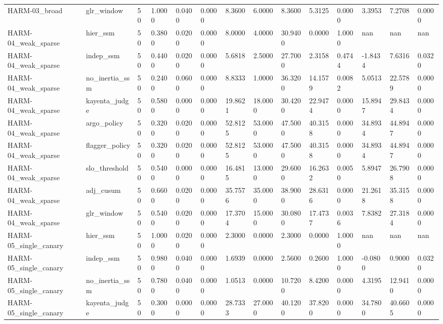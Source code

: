 \begin{table}[htbp]
\begin{tabular}{llllllllllllll}
HARM-03\_broad & glr\_window & 50 & 1.0000 & 0.0400 & 0.0000 & 8.3600 & 6.0000 & 8.3600 & 5.3125 & 0.0000 & 3.3953 & 7.2708 & 0.0000 \\
HARM-04\_weak\_sparse & hier\_ssm & 50 & 0.3800 & 0.0200 & 0.0000 & 8.0000 & 4.0000 & 30.9400 & 0.0000 & 1.0000 & nan & nan & nan \\
HARM-04\_weak\_sparse & indep\_ssm & 50 & 0.4400 & 0.0200 & 0.0000 & 5.6818 & 2.5000 & 27.7000 & 2.3158 & 0.4744 & -1.8434 & 7.6316 & 0.0320 \\
HARM-04\_weak\_sparse & no\_inertia\_ssm & 50 & 0.2400 & 0.0600 & 0.0000 & 8.8333 & 1.0000 & 36.3200 & 14.1579 & 0.0082 & 5.0513 & 22.5789 & 0.0000 \\
HARM-04\_weak\_sparse & kayenta\_judge & 50 & 0.5800 & 0.0000 & 0.0000 & 19.8621 & 18.0000 & 30.4200 & 22.9474 & 0.0000 & 15.8947 & 29.8434 & 0.0000 \\
HARM-04\_weak\_sparse & argo\_policy & 50 & 0.3200 & 0.0200 & 0.0000 & 52.8125 & 53.0000 & 47.5000 & 40.3158 & 0.0000 & 34.8934 & 44.8947 & 0.0000 \\
HARM-04\_weak\_sparse & flagger\_policy & 50 & 0.3200 & 0.0200 & 0.0000 & 52.8125 & 53.0000 & 47.5000 & 40.3158 & 0.0000 & 34.8934 & 44.8947 & 0.0000 \\
HARM-04\_weak\_sparse & slo\_threshold & 50 & 0.5400 & 0.0000 & 0.0000 & 16.4815 & 13.0000 & 29.6000 & 16.2632 & 0.0050 & 5.8947 & 26.7908 & 0.0000 \\
HARM-04\_weak\_sparse & adj\_cusum & 50 & 0.6600 & 0.0200 & 0.0000 & 35.7576 & 35.0000 & 38.9000 & 28.6316 & 0.0000 & 21.2618 & 35.3158 & 0.0000 \\
HARM-04\_weak\_sparse & glr\_window & 50 & 0.5400 & 0.0200 & 0.0000 & 17.3704 & 15.0000 & 30.0800 & 17.4737 & 0.0036 & 7.8382 & 27.3184 & 0.0000 \\
HARM-05\_single\_canary & hier\_ssm & 50 & 1.0000 & 0.0200 & 0.0000 & 2.3000 & 0.0000 & 2.3000 & 0.0000 & 1.0000 & nan & nan & nan \\
HARM-05\_single\_canary & indep\_ssm & 50 & 0.9800 & 0.0400 & 0.0000 & 1.6939 & 0.0000 & 2.5600 & 0.2600 & 1.0000 & -0.0800 & 0.9000 & 0.0320 \\
HARM-05\_single\_canary & no\_inertia\_ssm & 50 & 0.7800 & 0.0400 & 0.0000 & 1.0513 & 0.0000 & 10.7200 & 8.4200 & 0.0000 & 4.3195 & 12.9410 & 0.0000 \\
HARM-05\_single\_canary & kayenta\_judge & 50 & 0.3000 & 0.0000 & 0.0000 & 28.7333 & 27.0000 & 40.1200 & 37.8200 & 0.0000 & 34.7800 & 40.6605 & 0.0000 \\

\end{tabular}
\end{table}
